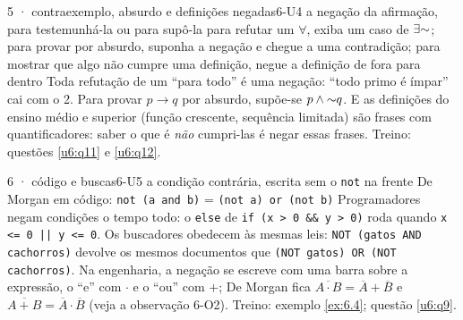 \begin{caso}{5 · contraexemplo, absurdo e definições negadas}{6-U4}
{a negação da afirmação, para testemunhá-la ou para supô-la}
{para refutar um $\forall$, exiba um caso de $\exists{{\sim}}$; para provar por absurdo, suponha a negação e chegue a uma contradição; para mostrar que algo não cumpre uma definição, negue a definição de fora para dentro}
\reconhecer Toda refutação de um \enquote{para todo} é uma negação: \enquote{todo primo é ímpar} cai com o 2. Para provar $p\rightarrow q$ por absurdo, supõe-se $p\wedge{{\sim}}q$. E as definições do ensino médio e superior (função crescente, sequência limitada) são frases com quantificadores: saber o que é \emph{não} cumpri-las é negar essas frases. Treino: questões \ref{u6:q11} e \ref{u6:q12}.
\end{caso}

\begin{caso}{6 · código e buscas}{6-U5}
{a condição contrária, escrita sem o \texttt{not} na frente}
{De Morgan em código: \texttt{not (a and b)} = \texttt{(not a) or (not b)}}
\reconhecer Programadores negam condições o tempo todo: o \texttt{else} de \texttt{if (x > 0 \&\& y > 0)} roda quando \texttt{x <= 0 || y <= 0}. Os buscadores obedecem às mesmas leis: \texttt{NOT (gatos AND cachorros)} devolve os mesmos documentos que \texttt{(NOT gatos) OR (NOT cachorros)}. Na engenharia, a negação se escreve com uma barra sobre a expressão, o \enquote{e} com $\cdot$ e o \enquote{ou} com $+$; De Morgan fica $\overline{A\cdot B}=\overline{A}+\overline{B}$ e $\overline{A+B}=\overline{A}\cdot\overline{B}$ (veja a observação 6-O2). Treino: exemplo \ref{ex:6.4}; questão \ref{u6:q9}.
\end{caso}

